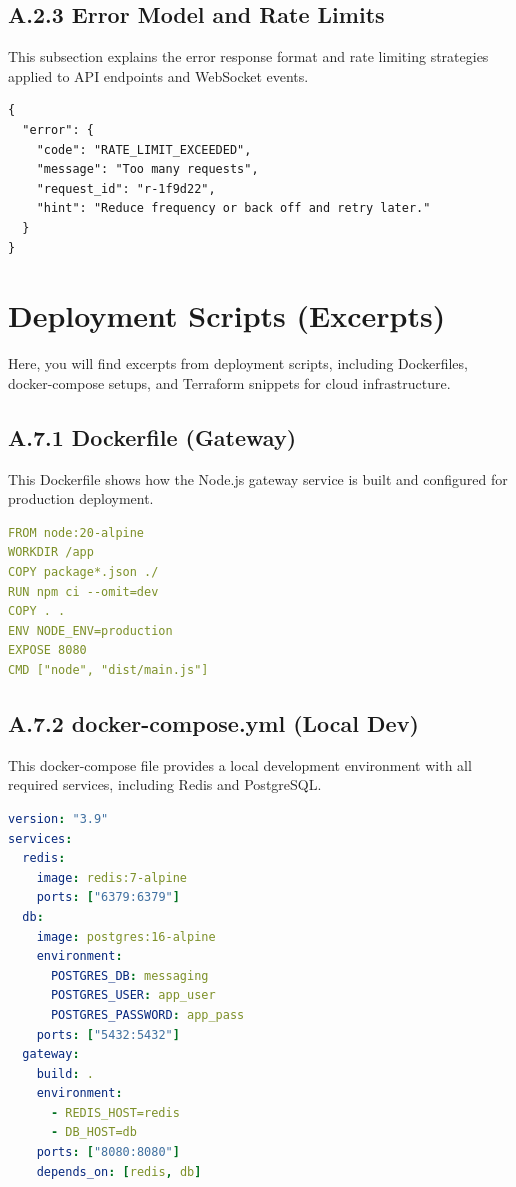 \subsection*{A.2.3 Error Model and Rate Limits}
This subsection explains the error response format and rate limiting strategies applied to API endpoints and WebSocket events.
\begin{lstlisting}[language={}, caption={Error envelope (all endpoints/events)}]
{
  "error": {
    "code": "RATE_LIMIT_EXCEEDED",
    "message": "Too many requests",
    "request_id": "r-1f9d22",
    "hint": "Reduce frequency or back off and retry later."
  }
}
\end{lstlisting}



\section{Deployment Scripts (Excerpts)}
Here, you will find excerpts from deployment scripts, including Dockerfiles, docker-compose setups, and Terraform snippets for cloud infrastructure.
\label{app:deploy}

\subsection*{A.7.1 Dockerfile (Gateway)}
This Dockerfile shows how the Node.js gateway service is built and configured for production deployment.
\begin{lstlisting}[language=yaml, caption={Dockerfile (Node.js gateway, simplified)}]
FROM node:20-alpine
WORKDIR /app
COPY package*.json ./
RUN npm ci --omit=dev
COPY . .
ENV NODE_ENV=production
EXPOSE 8080
CMD ["node", "dist/main.js"]
\end{lstlisting}

\subsection*{A.7.2 docker-compose.yml (Local Dev)}
This docker-compose file provides a local development environment with all required services, including Redis and PostgreSQL.
\begin{lstlisting}[language=yaml, caption={docker-compose (local development)}]
version: "3.9"
services:
  redis:
    image: redis:7-alpine
    ports: ["6379:6379"]
  db:
    image: postgres:16-alpine
    environment:
      POSTGRES_DB: messaging
      POSTGRES_USER: app_user
      POSTGRES_PASSWORD: app_pass
    ports: ["5432:5432"]
  gateway:
    build: .
    environment:
      - REDIS_HOST=redis
      - DB_HOST=db
    ports: ["8080:8080"]
    depends_on: [redis, db]
\end{lstlisting}

